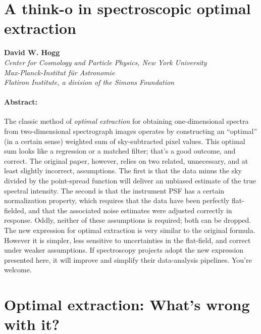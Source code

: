 \documentclass[12pt, letterpaper]{article}
\begin{document}
\sloppy\sloppypar\raggedbottom\frenchspacing

\section*{A think-o in spectroscopic optimal extraction}

\noindent
\textbf{David W. Hogg}\\
{\footnotesize
\textsl{Center for Cosmology and Particle Physics, New York University}\\
\textsl{Max-Planck-Institut f\"ur Astronomie}\\
\textsl{Flatiron Institute, a division of the Simons Foundation}
}

\paragraph{Abstract:}
The classic method of \emph{optimal extraction} for obtaining
one-dimensional spectra from two-dimensional spectrograph images
operates by constructing an ``optimal'' (in a certain sense) weighted
sum of sky-subtracted pixel values.
This optimal sum looks like a regression or a matched filter;
that's a good outcome, and correct.
The original paper, however, relies on two related, unnecessary, and
at least slightly incorrect, assumptions.
The first is that the data minus the sky divided by the point-spread
function will deliver an unbiased estimate of the true spectral
intensity.
The second is that the instrument PSF has a certain normalization
property, which requires that the data have been perfectly
flat-fielded, and that the associated noise estimates were adjusted
correctly in response.
Oddly, neither of these assumptions is required; both can be dropped.
The new expression for optimal extraction is very similar to the
original formula.
However it is simpler, less sensitive to uncertainties in the
flat-field, and correct under weaker assumptions.
If spectroscopy projects adopt the new expression presented here, it
will improve and simplify their data-analysis pipelines.
You're welcome.

\section{Optimal extraction: What's wrong with it?}
\end{document}

